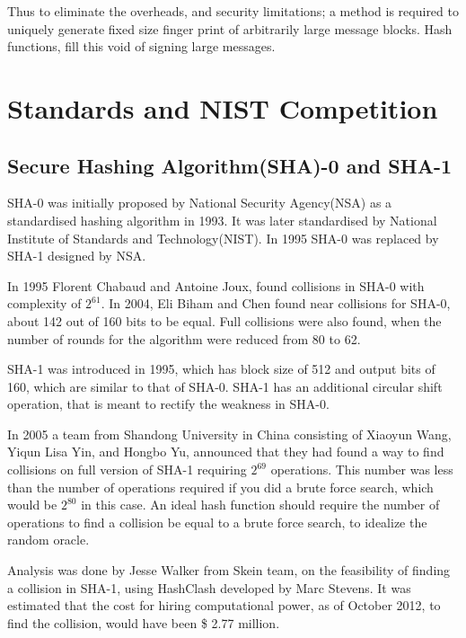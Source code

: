 Thus to eliminate the overheads, and security limitations; a method is required to uniquely generate fixed
size finger print of arbitrarily large message blocks. Hash functions, fill this void of signing large messages.

\section{Standards and NIST Competition} 

  \subsection{Secure Hashing Algorithm(SHA)-0 and SHA-1}

  SHA-0 was initially proposed by National Security Agency(NSA) as a standardised hashing algorithm
  in 1993. It was later standardised by National Institute of Standards and Technology(NIST). In 
  1995 SHA-0 was replaced by SHA-1 designed by NSA. \cite{00006, 00007}

  In 1995 Florent Chabaud and Antoine Joux, found collisions in SHA-0 with complexity of $2^{61}$. In
  2004, Eli Biham and Chen found near collisions for SHA-0, about 142 out of 160 bits to be equal. Full
  collisions were also found, when the number of rounds for the algorithm were reduced from 80 to 62.

  SHA-1 was introduced in 1995, which has block size of 512 and output bits of 160, which are similar
  to that of SHA-0. SHA-1 has an additional circular shift operation, that is meant to rectify the 
  weakness in SHA-0.

  In 2005 a team from Shandong University in China consisting of Xiaoyun Wang, Yiqun Lisa Yin, 
  and Hongbo Yu, announced that they had found a way to find collisions on full version of SHA-1 
  requiring $2^{69}$ operations. This number was less than the number of operations required if you
  did a brute force search, which would be $2^{80}$ in this case.\cite{00010} An ideal hash function 
  should require the number of operations to find a collision be equal to a brute force search, to 
  idealize the random oracle. 

  Analysis was done by Jesse Walker from Skein team, on the feasibility of finding a collision in 
  SHA-1, using HashClash developed by Marc Stevens. It was estimated that the cost for hiring 
  computational power, as of October 2012, to find the collision, would have been \$ 2.77 million.
  \cite{00008}

